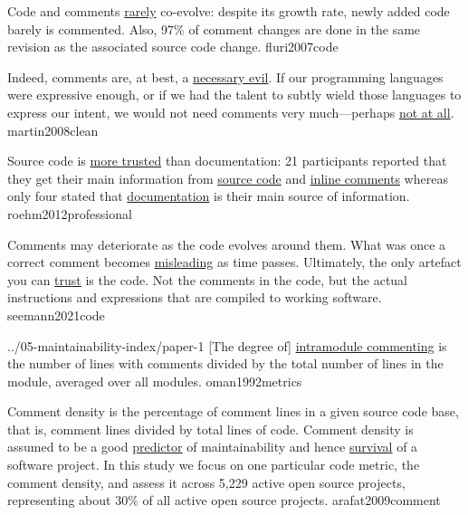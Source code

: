 \documentclass{article}
\begin{document}
  {Code and comments \ul{rarely} co-evolve: despite its growth rate, newly added code barely is commented. Also, 97\% of comment changes are done in the same revision as the associated source code change.}
  {fluri2007code}

  {Indeed, comments are, at best, a \ul{necessary evil}. If our programming languages were expressive enough, or if we had the talent to subtly wield those languages to express our intent, we would not need comments very much---perhaps \ul{not at all}.}
  {martin2008clean}

  {Source code is \ul{more trusted} than documentation: 21 participants reported that they get their main information from \ul{source code} and \ul{inline comments} whereas only four stated that \ul{documentation} is their main source of information.}
  {roehm2012professional}

  {Comments may deteriorate as the code evolves around them. What was once a correct comment becomes \ul{misleading} as time passes. Ultimately, the only artefact you can \ul{trust} is the code. Not the comments in the code, but the actual instructions and expressions that are compiled to working software.}
  {seemann2021code}


\lnQuote
  {../05-maintainability-index/paper-1}
  {[The degree of] \ul{intramodule commenting} is the number of lines with comments divided by the total number of lines in the module, averaged over all modules.}
  {oman1992metrics}

  {Comment density is the percentage of comment lines in a given source code base, that is, comment lines divided by total lines of code. Comment density is assumed to be a good \ul{predictor} of maintainability and hence \ul{survival} of a software project. In this study we focus on one particular code metric, the comment density, and assess it across 5,229 active open source projects, representing about 30\% of all active open source projects.}
  {arafat2009comment}
\end{document}
